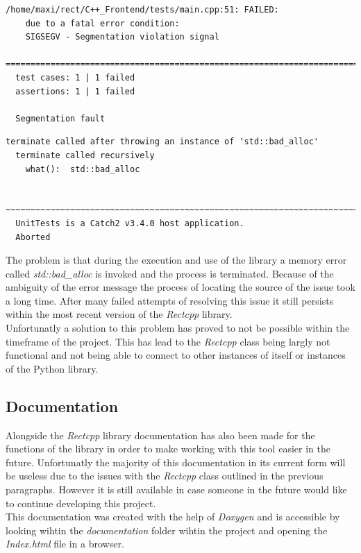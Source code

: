 \begin{minipage}{\textwidth}
\begin{lstlisting}[caption=One of the error messages of the Rectcpp class during execution]
  /home/maxi/rect/C++_Frontend/tests/main.cpp:51: FAILED:
    due to a fatal error condition:
    SIGSEGV - Segmentation violation signal
  ===============================================================================
  test cases: 1 | 1 failed
  assertions: 1 | 1 failed

  Segmentation fault
\end{lstlisting}

\begin{lstlisting}[caption=The other error message of the Rectcpp class during execution]
  terminate called after throwing an instance of 'std::bad_alloc'
  terminate called recursively
    what():  std::bad_alloc

  ~~~~~~~~~~~~~~~~~~~~~~~~~~~~~~~~~~~~~~~~~~~~~~~~~~~~~~~~~~~~~~~~~~~~~~~~~~~~~~~
  UnitTests is a Catch2 v3.4.0 host application.
  Aborted
\end{lstlisting}
\end{minipage}

The problem is that during the execution and use of the library a memory error called \textit{std::bad\_alloc} is invoked and the process is terminated. Because of 
the ambiguity of the error message the process of locating the source of the issue took a long time. After many failed attempts of resolving this issue it still
persists within the most recent version of the \textit{Rectcpp} library.\\

Unfortunatly a solution to this problem has proved to not be possible within the timeframe of the project. This has lead to the \textit{Rectcpp} class being 
largly not functional and not being able to connect to other instances of itself or instances of the Python library.

\subsection{Documentation}
Alongside the \textit{Rectcpp} library documentation has also been made for the functions of the library in order to make working with this tool easier in the future.
Unfortunatly the majority of this documentation in its current form will be useless due to the issues with the \textit{Rectcpp} class outlined in the previous paragraphs.
However it is still available in case someone in the future would like to continue developing this project.\\
This documentation was created with the help of \textit{Doxygen} and is accessible by looking wihtin the \textit{documentation} folder wihtin the project and opening
the \textit{Index.html} file in a browser. 

